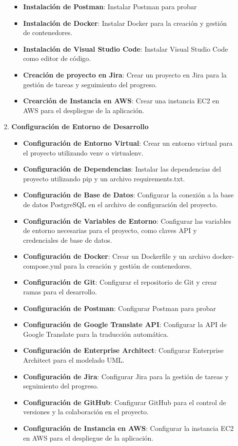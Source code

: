 \begin{doublespace}
\begin{enumerate}[label=\alph*)]
\begin{enumerate}
\begin{itemize}
            \item \textbf{Instalación de Postman}: Instalar Postman para probar
            \item \textbf{Instalación de Docker}: Instalar Docker para la creación y gestión de contenedores.
            \item \textbf{Instalación de Visual Studio Code}: Instalar Visual Studio Code como editor de código.
            \item \textbf{Creación de proyecto en Jira}: Crear un proyecto en Jira para la gestión de tareas y seguimiento del progreso.
            \item \textbf{Crearción de Instancia en AWS}: Crear una instancia EC2 en AWS para el despliegue de la aplicación.
        \end{itemize}
        \item \textbf{Configuración de Entorno de Desarrollo}\par
        \begin{itemize}
            \item \textbf{Configuración de Entorno Virtual}: Crear un entorno virtual para el proyecto utilizando venv o virtualenv.
            \item \textbf{Configuración de Dependencias}: Instalar las dependencias del proyecto utilizando pip y un archivo requirements.txt.
            \item \textbf{Configuración de Base de Datos}: Configurar la conexión a la base de datos PostgreSQL en el archivo de configuración del proyecto.
            \item \textbf{Configuración de Variables de Entorno}: Configurar las variables de entorno necesarias para el proyecto, como claves API y credenciales de base de datos.
            \item \textbf{Configuración de Docker}: Crear un Dockerfile y un archivo docker-compose.yml para la creación y gestión de contenedores.
            \item \textbf{Configuración de Git}: Configurar el repositorio de Git y crear ramas para el desarrollo.
            \item \textbf{Configuración de Postman}: Configurar Postman para probar
            \item \textbf{Configuración de Google Translate API}: Configurar la API de Google Translate para la traducción automática.
            \item \textbf{Configuración de Enterprise Architect}: Configurar Enterprise Architect para el modelado UML.
            \item \textbf{Configuración de Jira}: Configurar Jira para la gestión de tareas y seguimiento del progreso.
            \item \textbf{Configuración de GitHub}: Configurar GitHub para el control de versiones y la colaboración en el proyecto.
            \item \textbf{Configuración de Instancia en AWS}: Configurar la instancia EC2 en AWS para el despliegue de la aplicación.
        \end{itemize}


\end{enumerate}
\end{enumerate}
\end{doublespace}
